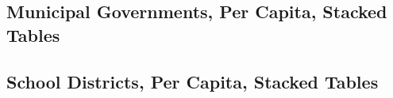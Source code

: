\documentclass{article}
\begin{document}
{	
	\subsection{Municipal Governments, Per Capita, Stacked Tables}
	
	
	\clearpage
	
	
	\subsection{School Districts, Per Capita, Stacked Tables}
	
	
	\clearpage
	
	
	
	
}
\end{document}
